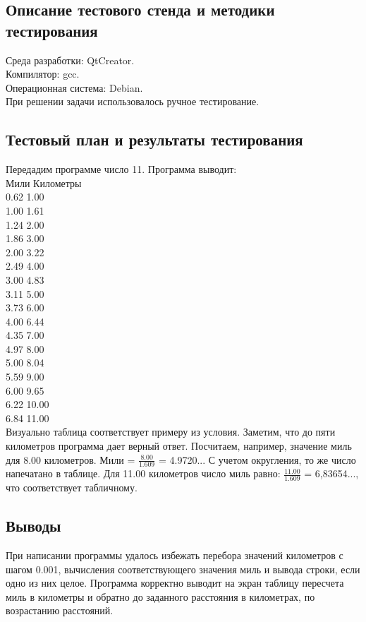 \documentclass[12pt,a4paper]{report}
\begin{document}
\subsection{Описание тестового стенда и методики тестирования}
Среда разработки: QtCreator.\\
Компилятор: gcc. \\
Операционная система: Debian. \\
При решении задачи использовалось ручное тестирование. 
\subsection{Тестовый план и результаты тестирования}
Передадим программе число 11. Программа выводит: \\
Мили Километры\\
0.62 1.00 \\
1.00 1.61 \\
1.24 2.00 \\
1.86 3.00 \\
2.00 3.22 \\
2.49 4.00 \\
3.00 4.83 \\
3.11 5.00 \\
3.73 6.00 \\
4.00 6.44 \\
4.35 7.00 \\
4.97 8.00 \\
5.00 8.04 \\
5.59 9.00 \\
6.00 9.65 \\
6.22 10.00 \\
6.84 11.00 \\
Визуально таблица соответствует примеру из условия. Заметим, что до пяти километров программа дает верный ответ. Посчитаем, например, значение миль для 8.00 километров. Мили = $\frac{8.00}{1.609}$ = 4.9720... С учетом округления, то же число напечатано в таблице. Для 11.00 километров число миль равно: $\frac{11.00}{1.609}$ = 6,83654..., что соответствует табличному. 
\subsection{Выводы}
При написании программы удалось избежать перебора значений километров с шагом 0.001, вычисления соответствующего значения миль и вывода строки, если одно из них целое. Программа корректно выводит на экран таблицу пересчета миль в километры и обратно до заданного расстояния в километрах, по возрастанию расстояний.
\end{document}
